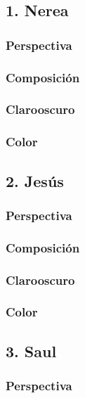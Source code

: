 \documentclass[12pt]{article}
\begin{document}
    \subsection{1. Nerea}
        \subsubsection{Perspectiva}
    
        \subsubsection{Composición}
    
        \subsubsection{Clarooscuro}
    
        \subsubsection{Color}
    \subsection{2. Jesús}
        \subsubsection{Perspectiva}
    
        \subsubsection{Composición}
    
        \subsubsection{Clarooscuro}
    
        \subsubsection{Color}
    \subsection{3. Saul}
        \subsubsection{Perspectiva}
    
\end{document}
